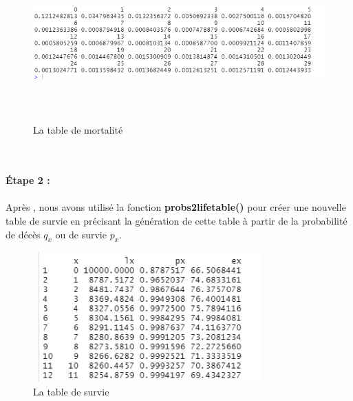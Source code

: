 \documentclass[french]{report}
\begin{document}
\newline
\begin{figure}[hhhhhhhh!]
    \centering
    \includegraphics[width=12cm, height=6cm]{kk.png}
    \caption{ La table de mortalité}
\end{figure}
\newline
\\ 
\\ \textbf{ Étape 2 :} \\
\\
Après , nous avons  utilisé la fonction \textbf{probs2lifetable()} pour créer une nouvelle table de survie en précisant la génération de cette table à partir de la probabilité de décès $q_x$ ou de survie $p_x$.
\newline
\newpage
\begin{figure}[hhhhhhhh!]
    \centering
    \includegraphics[width=9cm, height=5cm]{9.png}
    \caption{  La table de survie}

\end{figure}
\end{document}

